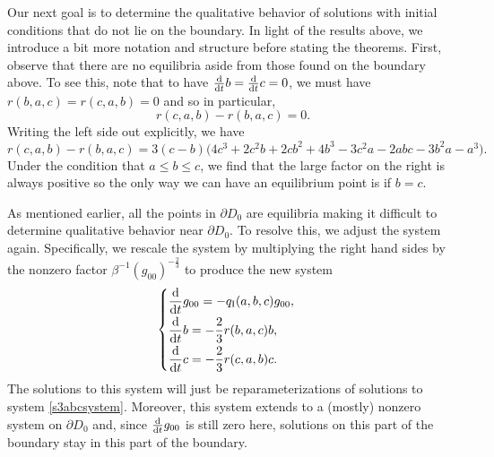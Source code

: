\documentclass[pdftex]{sigma}
\numberwithin{equation}{section}
\newcommand{\dtime}{\frac{{\rm d}}{{\rm d} t}} %
\begin{document}
Our next goal is to determine the qualitative behavior of solutions with initial conditions that do not lie on the boundary. In light of the results above, we introduce a bit more notation and structure before stating the theorems. First, observe that there are no equilibria aside from those found on the boundary above. To see this, note that to have $\dtime b = \dtime c = 0$, we must have $r(b, a, c) = r(c, a, b) = 0$ and so in particular,
\[
r(c, a, b) - r(b, a, c) = 0.
\]
Writing the left side out explicitly, we have
\[
r(c, a, b) - r(b, a, c) = 3(c - b)\big(4c^3 + 2c^2b + 2cb^2 + 4b^3 - 3c^2a - 2abc - 3b^2a - a^3\big).
\]
Under the condition that $a \leq b \leq c$, we find that the large factor on the right is always positive so the only way we can have an equilibrium point is if $b = c$.

As mentioned earlier, all the points in $\partial D_{0}$ are equilibria making it difficult to determine qualitative behavior near $\partial D_{0}$. To resolve this, we adjust the system again. Specifically, we rescale the system by multiplying the right hand sides by the nonzero factor $\beta^{-1} (g_{00})^{-\frac{2}{3}}$ to produce the new system
\begin{gather} \label{s3abcadjsystem}
\begin{cases}
\displaystyle \dtime g_{00} = -q_{\rm I}(a, b, c) g_{00}, \vspace{1mm}\\
\displaystyle \dtime b = -\frac{2}{3} r(b, a, c) b, \vspace{1mm}\\
\displaystyle \dtime c = -\frac{2}{3} r(c, a, b) c.
\end{cases}
\end{gather}
The solutions to this system will just be reparameterizations of solutions to system \eqref{s3abcsystem}. Moreover, this system extends to a (mostly) nonzero system on $\partial D_0$ and, since $\dtime g_{00}$ is still zero here, solutions on this part of the boundary stay in this part of the boundary.
\end{document}
